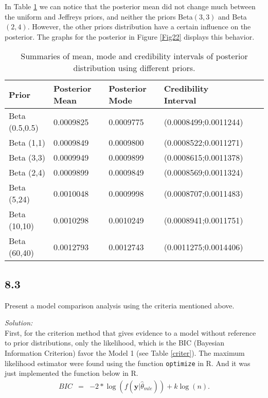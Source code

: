 \documentclass[a4paper, 11pt]{article}
\begin{document}
In Table \ref{prior2} we can notice that the posterior mean did not change much between the uniform and Jeffreys priors, and neither the priors Beta$(3,3)$ and Beta$(2,4)$. However, the other priors distribution have a certain influence on the posterior. The graphs for the posterior in Figure \ref{Fig22} displays this behavior.
\begin{table}[H]
\caption{Summaries of mean, mode and credibility intervals of posterior distribution using different priors.}\label{prior2}
\centering
\begin{tabular}{llllcc}
\hline
\mbox{Prior} & Posterior Mean & Posterior Mode & Credibility Interval\\
\hline
Beta (0.5,0.5) & 0.0009825 & 0.0009775 & (0.0008499;0.0011244)  \\

Beta (1,1)  & 0.0009849    & 0.0009800 & (0.0008522;0.0011271)\\

Beta (3,3)  & 0.0009949    & 0.0009899 & (0.0008615;0.0011378)\\

Beta (2,4)   & 0.0009899   & 0.0009849 & (0.0008569;0.0011324) \\

Beta (5,24)  & 0.0010048 & 0.0009998 & (0.0008707;0.0011483) \\

Beta (10,10) & 0.0010298 & 0.0010249 & (0.0008941;0.0011751) \\

Beta (60,40) & 0.0012793 & 0.0012743 & (0.0011275;0.0014406)\\
\hline
\end{tabular}
\end{table}

\subsection*{8.3} Present a model comparison analysis using the criteria mentioned above.

\noindent
\textit{Solution:}\\

First, for the criterion method that gives evidence to a model without reference to prior distributions, only the likelihood, which is the BIC (Bayesian Information Criterion) favor the Model 1 (see Table \ref{criter}). The maximum likelihood estimator were found using the function \texttt{optimize} in R. And it was just implemented the function below in R.
\begin{equation*}
\begin{array}{lclll}
BIC & = &  -2*\log(f(\textbf{y}|\hat{\theta}_{mle})) + k\log(n).\\
\end{array}
\end{equation*}
\end{document}
